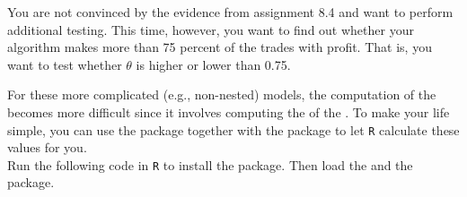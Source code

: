 \setcounter{section}{8}
\setcounter{subsection}{5}
\setcounter{question}{0}



You are not convinced by the evidence from assignment 8.4 and want to perform additional testing. This time, however, you want to find out whether your algorithm makes more than 75 percent of the trades with profit. That is, you want to test whether $\theta$ is higher or lower than 0.75.\\



For these more complicated (e.g., non-nested) models, the computation of the  becomes more difficult since it involves computing the  of the . To make your life simple, you can use the  package together with the  package to let \texttt{R} calculate these values for you. \\

Run the following code in \texttt{R} to install the  package. Then load the  and the  package. \\
\\

